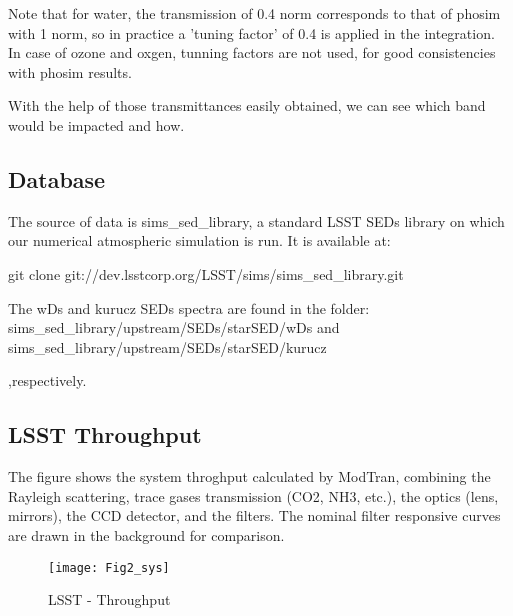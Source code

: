 \documentclass[a4paper,12pt]{article}
\begin{document}
\raggedright
Note that for water, the transmission of 0.4 norm corresponds to that of phosim with 1 norm, so in practice a 'tuning factor' of 0.4 is applied in the integration. In case of ozone and oxgen, tunning factors are not used, for good consistencies with phosim results.

With the help of those transmittances easily obtained, we can see which band would be impacted and how.
 
 \clearpage
\subsection{Database}

The source of data is sims\_sed\_library, a standard LSST SEDs library on which our numerical atmospheric simulation is run. It is available at:

git clone git://dev.lsstcorp.org/LSST/sims/sims\_sed\_library.git

The wDs and kurucz SEDs spectra are found in the folder: 
 sims\_sed\_library/upstream/SEDs/starSED/wDs and 
sims\_sed\_library/upstream/SEDs/starSED/kurucz

,respectively.

\clearpage
\subsection{LSST Throughput}
The figure shows the system throghput calculated by ModTran, combining the Rayleigh scattering, trace gases transmission (CO2, NH3, etc.), the optics (lens, mirrors), the CCD detector, and the filters. The nominal filter responsive curves are drawn in the background for comparison. 
\FloatBarrier
\graphicspath{{/home/bruno/users/weh40/Pictures/5figs/}}
\begin{figure}[h!]
\begin{center}
\texttt{[image: Fig2\_sys]}
\caption{LSST - Throughput}
\end{center}
\end{figure}
\FloatBarrier



\clearpage

\end{document}
